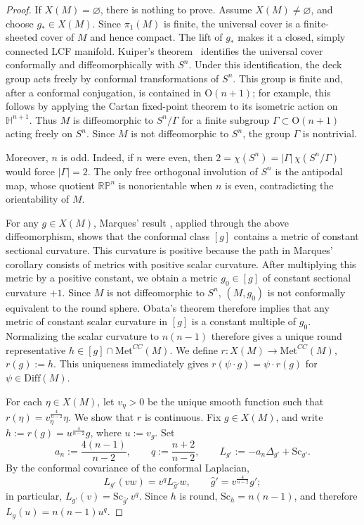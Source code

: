 \documentclass[12pt,oneside,a4paper]{article}
\theoremstyle{mytheorem}
\theoremstyle{remark}
\theoremstyle{definition}
\begin{document}
\begin{proof}
If $X(M)=\varnothing$, there is nothing to prove. Assume
$X(M)\neq\varnothing$, and choose $g_*\in X(M)$. Since $\pi_1(M)$ is finite,
the universal cover is a finite-sheeted cover of $M$ and hence compact. The
lift of $g_*$ makes it a closed, simply connected LCF manifold. Kuiper's
theorem~\cite{zbMATH03061883} identifies the universal cover conformally and
diffeomorphically with $S^n$. Under this identification, the deck group acts
freely by conformal transformations of $S^n$. This group is finite and, after
a conformal conjugation, is contained in $\mathrm{O}(n+1)$; for example, this
follows by applying the Cartan fixed-point theorem to its isometric action on
$\mathbb H^{n+1}$. Thus $M$ is diffeomorphic to $S^n/\Gamma$ for a finite
subgroup $\Gamma\subset\mathrm{O}(n+1)$ acting freely on $S^n$. Since $M$ is
not diffeomorphic to $S^n$, the group $\Gamma$ is nontrivial.

Moreover, $n$ is odd. Indeed, if $n$ were even, then
\(2=\chi(S^n)=|\Gamma|\,\chi(S^n/\Gamma)\)
would force $|\Gamma|=2$. The only free orthogonal involution of $S^n$ is the
antipodal map, whose quotient $\mathbb{RP}^n$ is nonorientable when $n$ is
even, contradicting the orientability of $M$.

For any $g\in X(M)$, Marques' result
\cite[Corollary~3.2]{MR2950765}, applied through the above diffeomorphism,
shows that the conformal class $[g]$ contains a metric of constant sectional
curvature. This curvature is positive because the path in Marques' corollary
consists of metrics with positive scalar curvature. After multiplying this metric by a positive constant, we
obtain a metric $g_0\in[g]$ of constant sectional curvature $+1$. Since $M$ is
not diffeomorphic to $S^n$, $(M,g_0)$ is not conformally equivalent to the
round sphere. Obata's theorem \cite{zbMATH03374588} therefore implies that any metric of
constant scalar curvature in $[g]$ is a constant multiple of $g_0$.
Normalizing the scalar curvature to $n(n-1)$ therefore gives a unique round
representative
\(
h\in[g]\cap\mathrm{Met}^{CC}(M).
\)
We define
\(r\colon X(M)\to \mathrm{Met}^{CC}(M)\),
\(r(g):=h\).
This uniqueness immediately gives
\(r(\psi\cdot g)=\psi\cdot r(g)\)
for \(\psi\in\mathrm{Diff}(M)\).

For each $\eta\in X(M)$, let $v_\eta>0$ be the unique smooth function such
that \(r(\eta)=v_\eta^{\frac{4}{n-2}}\eta\).
We show that $r$ is continuous. Fix \(g\in X(M)\), and write
$h:=r(g)=u^{\frac{4}{n-2}}g$, where $u:=v_g$. Set
\[
a_n:=\frac{4(n-1)}{n-2},
\qquad
q:=\frac{n+2}{n-2},
\qquad
L_{g'}:=-a_n\Delta_{g'}+\mathrm{Sc}_{g'}.
\]
By the conformal covariance of the conformal Laplacian,
\[
L_{g'}(vw)=v^qL_{\widehat g'}w,
\qquad
\widehat g'=v^{\frac{4}{n-2}}g';
\]
in particular,
\(L_{g'}(v)=\mathrm{Sc}_{\widehat g'}\,v^q\).
Since \(h\) is round, \(\mathrm{Sc}_h=n(n-1)\), and therefore
\(
L_g(u)=n(n-1)u^q.
\)



\end{proof}
\end{document}
